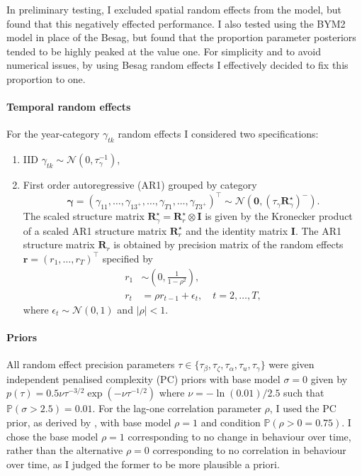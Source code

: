 \documentclass[a4paper, nobind]{templates/ociamthesis}
\providecommand{\tightlist}{%
  \setlength{\itemsep}{0pt}\setlength{\parskip}{0pt}}
\begin{document}
In preliminary testing, I excluded spatial random effects from the model, but found that this negatively effected performance.
I also tested using the BYM2 model \autocite{simpson2017penalising} in place of the Besag, but found that the proportion parameter posteriors tended to be highly peaked at the value one.
For simplicity and to avoid numerical issues, by using Besag random effects I effectively decided to fix this proportion to one.

\hypertarget{temporal-random-effects}{%
\paragraph{Temporal random effects}\label{temporal-random-effects}}

For the year-category \(\gamma_{tk}\) random effects I considered two specifications:

\begin{enumerate}
\def\labelenumi{\arabic{enumi}.}
\tightlist
\item
  IID \(\gamma_{tk} \sim \mathcal{N}(0, \tau_\gamma^{-1})\),
\item
  First order autoregressive (AR1) grouped by category
  \[
  \bm{\gamma} = (\gamma_{11}, \ldots, \gamma_{13^{+}}, \ldots, \gamma_{T1}, \ldots, \gamma_{T3^{+}})^\top \sim \mathcal{N}(\mathbf{0}, (\tau_\gamma \mathbf{R}^\star_\gamma)^{-}).
  \]
  The scaled structure matrix \(\mathbf{R}^\star_\gamma = \mathbf{R}^\star_r \otimes \mathbf{I}\) is given by the Kronecker product of a scaled AR1 structure matrix \(\mathbf{R}^\star_r\) and the identity matrix \(\mathbf{I}\).
  The AR1 structure matrix \(\mathbf{R}_r\) is obtained by precision matrix of the random effects \(\mathbf{r} = (r_1, \ldots, r_T)^\top\) specified by
  \begin{align}
  r_1 &\sim \left( 0, \frac{1}{1 - \rho^2} \right), \\
  r_t &= \rho r_{t - 1} + \epsilon_t, \quad t = 2, \ldots, T, 
  \end{align}
  where \(\epsilon_t \sim \mathcal{N}(0, 1)\) and \(|\rho| < 1\).
\end{enumerate}

\hypertarget{priors}{%
\paragraph{Priors}\label{priors}}

All random effect precision parameters \(\tau \in \{\tau_\beta, \tau_\zeta, \tau_\alpha, \tau_u, \tau_\gamma\}\) were given independent penalised complexity (PC) priors \autocite{simpson2017penalising} with base model \(\sigma = 0\) given by \(p(\tau) = 0.5 \nu \tau^{-3/2} \exp \left( - \nu \tau^{-1/2} \right)\) where \(\nu = - \ln(0.01) / 2.5\) such that \(\mathbb{P}(\sigma > 2.5) = 0.01\).
For the lag-one correlation parameter \(\rho\), I used the PC prior, as derived by \textcite{sorbye2017penalised}, with base model \(\rho = 1\) and condition \(\mathbb{P}(\rho > 0 = 0.75)\).
I chose the base model \(\rho = 1\) corresponding to no change in behaviour over time, rather than the alternative \(\rho = 0\) corresponding to no correlation in behaviour over time, as I judged the former to be more plausible a priori.
\end{document}
